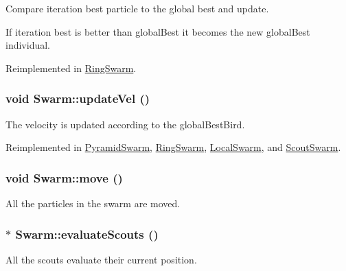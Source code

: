 Compare iteration best particle to the global best and update. 

If iteration best is better than globalBest it becomes the new globalBest individual. 

Reimplemented in \hyperlink{classRingSwarm_0c1b5e24190746a5880d95cf6dd16a15}{RingSwarm}.\hypertarget{classSwarm_be668c680f5bdd27bd2c4244a8a431bf}{
\subsubsection{\setlength{\rightskip}{0pt plus 5cm}void Swarm::updateVel ()}}
\label{classSwarm_be668c680f5bdd27bd2c4244a8a431bf}


The velocity is updated according to the globalBestBird. 



Reimplemented in \hyperlink{classPyramidSwarm_4f43e6459e6fede3785780facb4c5e1f}{PyramidSwarm}, \hyperlink{classRingSwarm_6af7a38a18e36ee6dfb3b6e4524f9da9}{RingSwarm}, \hyperlink{classLocalSwarm_08e4a17b8b74ff1c4da77975140613e7}{LocalSwarm}, and \hyperlink{classScoutSwarm_0a3e4d9f343702e42a6cb64349a25711}{ScoutSwarm}.\hypertarget{classSwarm_41d6aa35d312751a1f9cb6977a545beb}{
\subsubsection{\setlength{\rightskip}{0pt plus 5cm}void Swarm::move ()}}
\label{classSwarm_41d6aa35d312751a1f9cb6977a545beb}


All the particles in the swarm are moved. 

\hypertarget{classSwarm_39eaa4eed93a5d2731f5b1d5ecac8fa5}{
\subsubsection{ $\ast$ Swarm::evaluateScouts ()}}
\label{classSwarm_39eaa4eed93a5d2731f5b1d5ecac8fa5}


All the scouts evaluate their current position. 

